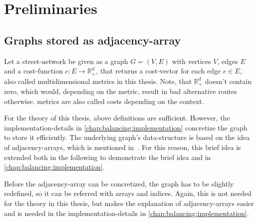 \chapter{Preliminaries}
\label{chap:preliminaries}


\section{Graphs stored as adjacency-array}
\label{chap:preliminaries:graphs}


    Let a street-network be given as a graph $G = (V, E)$ with vertices $V$, edges $E$ and a cost-function $c: E \to \mathbb{R}_+^d$, that returns a cost-vector for each edge $e \in E$, also called multidimensional \glspl{metric} in this thesis.
    Note, that $\mathbb{R}_+^d$ doesn't contain zero, which would, depending on the \gls{metric}, result in bad alternative routes otherwise.
    \Glspl{metric} are also called \glspl{cost} depending on the context.

    For the theory of this thesis, above definitions are sufficient.
    However, the implementation-details in \cref{chap:balancing:implementation} concretize the graph to store it efficiently.
    The underlying graph's data-structure is based on the idea of adjacency-arrays, which is mentioned in~\cite{mehlhorn:algorithms}.
    For this reason, this brief idea is extended both in the following to demonstrate the brief idea and in \cref{chap:balancing:implementation}.

    Before the adjacency-array can be concretized, the graph has to be slightly redefined, so it can be referred with arrays and indices.
    Again, this is not needed for the theory in this thesis, but makes the explanation of adjacency-arrays easier and is needed in the implementation-details in \cref{chap:balancing:implementation}.

